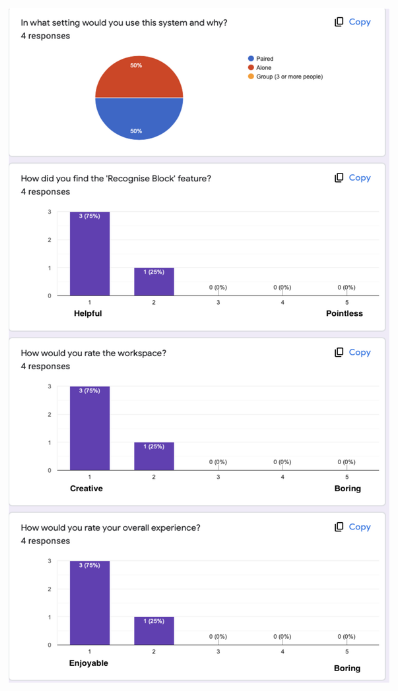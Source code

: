 \documentclass[oneside,%
                    author={Malak Hajji},
                    degree={BSc},
                    title={Designing An Accessible Ozobot Programming Platform for Students},
                  subtitle={With Mixed Visual Abilities}]{dissertation}
\begin{document}
\begin{figure}
    \centering
    \includegraphics[width=0.9\textwidth]{thesis/feedback1.eps}
    \label{fig-feedback}
\end{figure}
\end{document}
